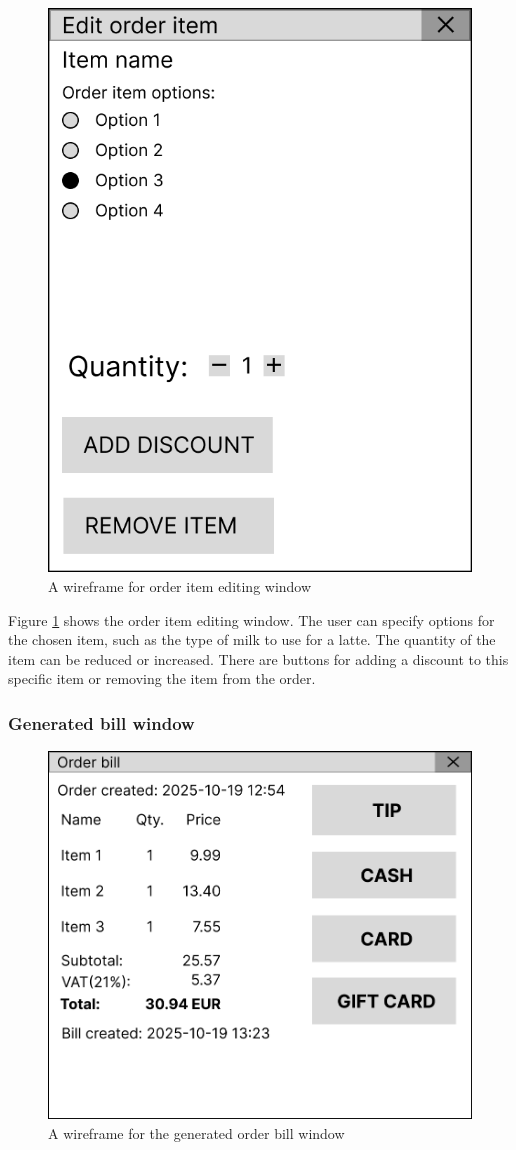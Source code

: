 \documentclass[11pt,a4paper,pdftex]{article}
\begin{document}
\begin{figure}[H]
    \centering
    \includegraphics[width=0.5\linewidth]{wireframes/OrderItemOptions.png}
    \caption{A wireframe for order item editing window}
    \label{fig:wireframe_item_options}
\end{figure}

Figure \ref{fig:wireframe_item_options} shows the order item editing window. The user can specify options for the chosen item, such as the type of milk to use for a latte. The quantity of the item can be reduced or increased. There are buttons for adding a discount to this specific item or removing the item from the order.

\subsubsection{Generated bill window}

\begin{figure}[H]
    \centering
    \includegraphics[width=0.5\linewidth]{wireframes/OrderBill.png}
    \caption{A wireframe for the generated order bill window}
    \label{fig:wireframe_order_bill}
\end{figure}
\end{document}
